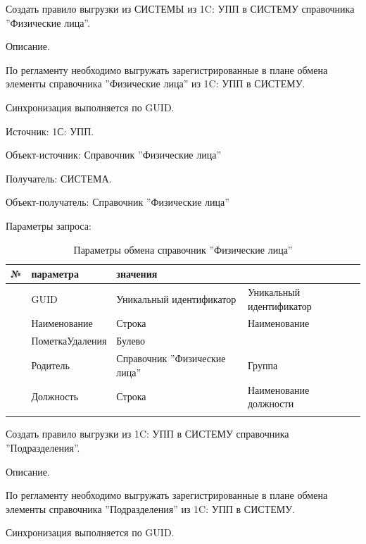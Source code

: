 Создать правило выгрузки из СИСТЕМЫ из  1C: УПП в СИСТЕМУ справочника ''Физические лица''.

Описание.

По регламенту необходимо выгружать зарегистрированные в плане обмена элементы справочника ''Физические лица'' из 1C: УПП в СИСТЕМУ.

Синхронизация выполняется по GUID.

Источник: 1С: УПП.

Объект-источник: Справочник ''Физические лица'' 

Получатель: СИСТЕМА.

Объект-получатель: Справочник ''Физические лица''

Параметры запроса:
\pc
\scriptsize
\begin{longtable}{|p{10mm}|p{35mm}|p{40mm}|p{60mm}|}
\hline
\parbox[c][5mm]{10mm}{\centering№} & \parbox[c]{35mm}{ параметра} & \parbox[c]{40mm}{ значения} & \parbox[c]{60mm}{} \\
\hline
\parbox[c][5mm]{16mm}{\p} & GUID & Уникальный идентификатор & Уникальный идентификатор \\
\hline
\parbox[c][5mm]{16mm}{\p} & Наименование &     Строка & Наименование \\
\hline
\parbox[c][5mm]{16mm}{\p} & ПометкаУдаления & Булево & \\
\hline
\parbox[c][5mm]{16mm}{\p} & Родитель & Справочник ''Физические лица'' & Группа \\
\hline
\parbox[c][5mm]{16mm}{\p} & Должность  & Строка & Наименование должности \\
\hline
\caption{Параметры обмена справочник ''Физические лица''}\label{ex:workers}
\end{longtable}  
\normalsize




Создать правило выгрузки из  1C: УПП в СИСТЕМУ справочника ''Подразделения''.

Описание.

По регламенту необходимо выгружать зарегистрированные в плане обмена элементы справочника ''Подразделения'' из 1C: УПП в СИСТЕМУ.

Синхронизация выполняется по GUID.

